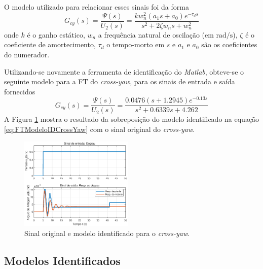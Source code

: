 O modelo utilizado para relacionar esses sinais foi da forma
\begin{equation}\label{eq:FTCrossYaw}
    G_{cy}(s) = \frac{\Psi(s)}{U_{2}(s)} = \frac{k w_{n}^2 (a_{1} s + a_{0})e^{-\tau_d s}}{s^2 + 2 \zeta w_{n} s + w_{n}^2}
\end{equation}
\noindent onde $k$ é o ganho estático, $w_n$ a frequência natural de oscilação (em $\si{\radian/\s}$), $\zeta$ é o coeficiente de amortecimento, $\tau_d$ o tempo-morto em $\si{s}$ e $a_{1}$ e $a_{0}$ são os coeficientes do numerador.

Utilizando-se novamente a ferramenta de identificação do \textit{Matlab}, obteve-se o seguinte modelo para a FT do \textit{cross-yaw}, para os sinais de entrada e saída fornecidos
\begin{equation}\label{eq:FTModeloIDCrossYaw}
    G_{cy}(s) = \frac{\Psi(s)}{U_{2}(s)} = \frac{0.0476(s+1.2945)e^{-0.13s}}{s^2 + 0.6339 s + 4.262}
\end{equation}
A Figura \ref{fig:IdentificacaoCrossYawFinal} mostra o resultado da sobreposição do modelo identificado na equação \eqref{eq:FTModeloIDCrossYaw} com o sinal original do \textit{cross-yaw}.

\begin{figure}[H]
    \centering
    \includegraphics[width=0.48\textwidth]{figures/Identificacao/IdentificaCrossYawFinal.eps}
    \caption{Sinal original e modelo identificado para o \textit{cross-yaw}.}
    \label{fig:IdentificacaoCrossYawFinal}
\end{figure}

\subsection{\textbf{Modelos Identificados}}

